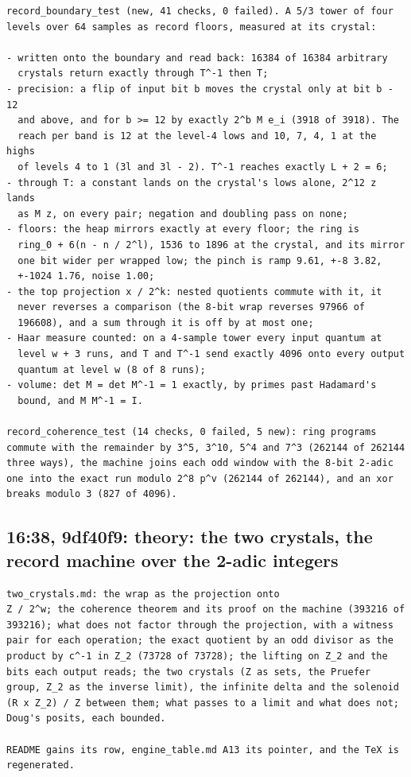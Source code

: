 \begin{Verbatim}
record_boundary_test (new, 41 checks, 0 failed). A 5/3 tower of four
levels over 64 samples as record floors, measured at its crystal:

- written onto the boundary and read back: 16384 of 16384 arbitrary
  crystals return exactly through T^-1 then T;
- precision: a flip of input bit b moves the crystal only at bit b - 12
  and above, and for b >= 12 by exactly 2^b M e_i (3918 of 3918). The
  reach per band is 12 at the level-4 lows and 10, 7, 4, 1 at the highs
  of levels 4 to 1 (3l and 3l - 2). T^-1 reaches exactly L + 2 = 6;
- through T: a constant lands on the crystal's lows alone, 2^12 z lands
  as M z, on every pair; negation and doubling pass on none;
- floors: the heap mirrors exactly at every floor; the ring is
  ring_0 + 6(n - n / 2^l), 1536 to 1896 at the crystal, and its mirror
  one bit wider per wrapped low; the pinch is ramp 9.61, +-8 3.82,
  +-1024 1.76, noise 1.00;
- the top projection x / 2^k: nested quotients commute with it, it
  never reverses a comparison (the 8-bit wrap reverses 97966 of
  196608), and a sum through it is off by at most one;
- Haar measure counted: on a 4-sample tower every input quantum at
  level w + 3 runs, and T and T^-1 send exactly 4096 onto every output
  quantum at level w (8 of 8 runs);
- volume: det M = det M^-1 = 1 exactly, by primes past Hadamard's
  bound, and M M^-1 = I.

record_coherence_test (14 checks, 0 failed, 5 new): ring programs
commute with the remainder by 3^5, 3^10, 5^4 and 7^3 (262144 of 262144
three ways), the machine joins each odd window with the 8-bit 2-adic
one into the exact run modulo 2^8 p^v (262144 of 262144), and an xor
breaks modulo 3 (827 of 4096).
\end{Verbatim}

\subsection{\texorpdfstring{16:38, 9df40f9: theory: the two crystals, the record machine over the 2-adic integers}{16:38, 9df40f9: theory: the two crystals, the record machine over the 2-adic integers}}

\begin{Verbatim}
two_crystals.md: the wrap as the projection onto
Z / 2^w; the coherence theorem and its proof on the machine (393216 of
393216); what does not factor through the projection, with a witness
pair for each operation; the exact quotient by an odd divisor as the
product by c^-1 in Z_2 (73728 of 73728); the lifting on Z_2 and the
bits each output reads; the two crystals (Z as sets, the Pruefer
group, Z_2 as the inverse limit), the infinite delta and the solenoid
(R x Z_2) / Z between them; what passes to a limit and what does not;
Doug's posits, each bounded.

README gains its row, engine_table.md A13 its pointer, and the TeX is
regenerated.
\end{Verbatim}

